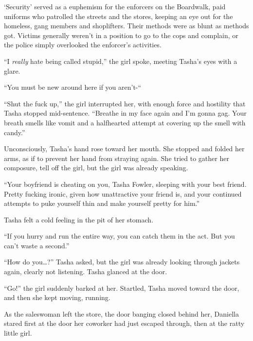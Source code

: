 `Security' served as a euphemism for the enforcers on the Boardwalk, paid uniforms who patrolled the streets and the stores, keeping an eye out for the homeless, gang members and shoplifters.  Their methods were as blunt as methods got.  Victims generally weren't in a position to go to the cops and complain, or the police simply overlooked the enforcer's activities.



``I \emph{really} hate being called stupid,'' the girl spoke, meeting Tasha's eyes with a glare.



``You must be new around here if you aren't-``



``Shut the fuck up,'' the girl interrupted her, with enough force and hostility that Tasha stopped mid-sentence.  ``Breathe in my face again and I'm gonna gag.  Your breath smells like vomit and a halfhearted attempt at covering up the smell with candy.''



Unconsciously, Tasha's hand rose toward her mouth.  She stopped and folded her arms, as if to prevent her hand from straying again.  She tried to gather her composure, tell off the girl, but the girl was already speaking.



``Your boyfriend is cheating on you, Tasha Fowler, sleeping with your best friend.  Pretty fucking ironic, given how unattractive your friend is, and your continued attempts to puke yourself thin and make yourself pretty for him.''



Tasha felt a cold feeling in the pit of her stomach.



``If you hurry and run the entire way, you can catch them in the act.  But you can't waste a second.''



``How do you\ldots?''  Tasha asked, but the girl was already looking through jackets again, clearly not listening.  Tasha glanced at the door.



``Go!'' the girl suddenly barked at her.  Startled, Tasha moved toward the door, and then she kept moving, running.



As the saleswoman left the store, the door banging closed behind her, Daniella stared first at the door her coworker had just escaped through, then at the ratty little girl.



